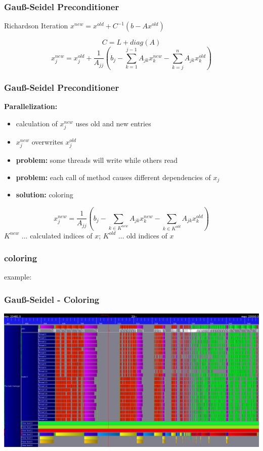 \documentclass{beamer}
\begin{document}
\begin{frame}
\frametitle{Gau\ss-Seidel Preconditioner}
\begin{block}{Richardson Iteration}
$x^{new} = x^{old} + C^{-1} (b - Ax^{old})$
\end{block}
$$C = L + diag(A)$$
$$x_j^{new} = x_j^{old} + \frac{1}{A_{jj}} \left(b_{j} - \sum_{k=1}^{j-1} A_{jk}
x_k^{new} - \sum_{k=j}^{n} A_{jk} x_k^{old}\right)$$

\end{frame}

\begin{frame}
\frametitle{Gau\ss-Seidel Preconditioner}

\textbf{Parallelization:}
\begin{itemize}
\item calculation of $x_j^{new}$ uses old and new entries
\item $x_j^{new}$ overwrites $x_j^{old}$
\item \textbf{problem:} some threads will write while others read
\item \textbf{problem:} each call of method causes different dependencies of $x_j$ 
\item \textbf{solution:}
coloring
\end{itemize}


$$ x_j^{new} = \frac{1}{A_{jj}} \left(b_{j} - \sum_{k \in K^{new}}A_{jk}
 x_k^{new} - \sum_{k \in K^{old}}A_{jk} x_k^{old}\right)$$
$K^{new}$ ... calculated indices of $x$;
$K^{old}$ ... old indices of $x$
\end{frame}

\begin{frame}
\frametitle{coloring}
example:
\end{frame}

\begin{frame}
\frametitle{Gau\ss-Seidel - Coloring}
\includegraphics[width=1\linewidth]{undistributed_coloring_gs.png}
\end{frame}
\end{document}
